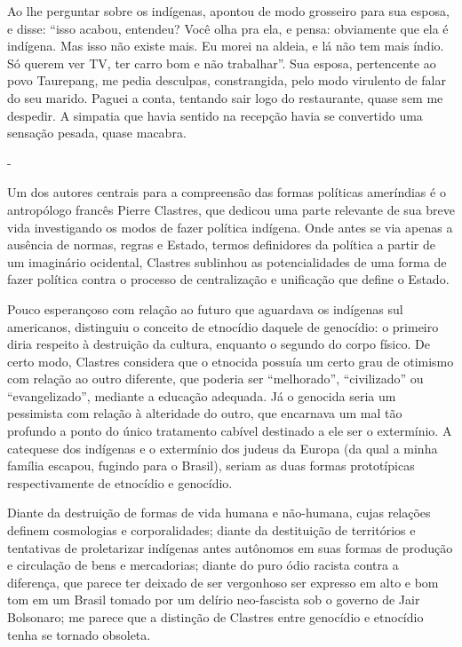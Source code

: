 Ao lhe perguntar sobre os indígenas, apontou de modo grosseiro para sua
esposa, e disse: ``isso acabou, entendeu? Você olha pra ela, e pensa:
obviamente que ela é indígena. Mas isso não existe mais. Eu morei na
aldeia, e lá não tem mais índio. Só querem ver TV, ter carro bom e não
trabalhar''. Sua esposa, pertencente ao povo Taurepang, me pedia
desculpas, constrangida, pelo modo virulento de falar do seu marido.
Paguei a conta, tentando sair logo do restaurante, quase sem me
despedir. A simpatia que havia sentido na recepção havia se convertido
uma sensação pesada, quase macabra.

-

Um dos autores centrais para a compreensão das formas políticas
ameríndias é o antropólogo francês Pierre Clastres, que dedicou uma
parte relevante de sua breve vida investigando os modos de fazer
política indígena. Onde antes se via apenas a ausência de normas, regras
e Estado, termos definidores da política a partir de um imaginário
ocidental, Clastres sublinhou as potencialidades de uma forma de fazer
política contra o processo de centralização e unificação que define o
Estado.

Pouco esperançoso com relação ao futuro que aguardava os indígenas sul
americanos, distinguiu o conceito de etnocídio daquele de genocídio: o
primeiro diria respeito à destruição da cultura, enquanto o segundo do
corpo físico. De certo modo, Clastres considera que o etnocida possuía
um certo grau de otimismo com relação ao outro diferente, que poderia
ser ``melhorado'', ``civilizado'' ou ``evangelizado'', mediante a
educação adequada. Já o genocida seria um pessimista com relação à
alteridade do outro, que encarnava um mal tão profundo a ponto do único
tratamento cabível destinado a ele ser o extermínio. A catequese dos
indígenas e o extermínio dos judeus da Europa (da qual a minha família
escapou, fugindo para o Brasil), seriam as duas formas prototípicas
respectivamente de etnocídio e genocídio.

Diante da destruição de formas de vida humana e não-humana, cujas
relações definem cosmologias e corporalidades; diante da destituição de
territórios e tentativas de proletarizar indígenas antes autônomos em
suas formas de produção e circulação de bens e mercadorias; diante do
puro ódio racista contra a diferença, que parece ter deixado de ser
vergonhoso ser expresso em alto e bom tom em um Brasil tomado por um
delírio neo-fascista sob o governo de Jair Bolsonaro; me parece que a
distinção de Clastres entre genocídio e etnocídio tenha se tornado
obsoleta.

